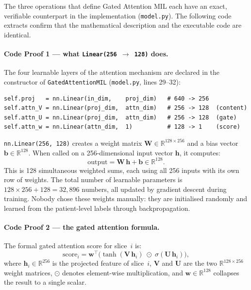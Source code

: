 The three operations that define Gated Attention MIL
each have an exact, verifiable counterpart in the
implementation (\texttt{model.py}).
The following code extracts confirm that the mathematical
description and the executable code are identical.


\paragraph{Code Proof 1 — what \texttt{Linear(256\,$\to$\,128)} does.}

The four learnable layers of the attention mechanism
are declared in the constructor of \texttt{GatedAttentionMIL}
(\texttt{model.py}, lines 29--32):

\begin{verbatim}
self.proj   = nn.Linear(in_dim,    proj_dim)   # 640 -> 256
self.attn_V = nn.Linear(proj_dim,  attn_dim)   # 256 -> 128  (content)
self.attn_U = nn.Linear(proj_dim,  attn_dim)   # 256 -> 128  (gate)
self.attn_w = nn.Linear(attn_dim,  1)          # 128 -> 1    (score)
\end{verbatim}

\texttt{nn.Linear(256, 128)} creates a weight matrix
$\mathbf{W} \in \mathbb{R}^{128 \times 256}$
and a bias vector $\mathbf{b} \in \mathbb{R}^{128}$.
When called on a 256-dimensional input vector
$\mathbf{h}$, it computes:
\begin{equation}
  \text{output} = \mathbf{W}\,\mathbf{h} + \mathbf{b}
  \in \mathbb{R}^{128}.
\end{equation}
This is 128 simultaneous weighted sums, each using
all 256 inputs with its own row of weights.
The total number of learnable parameters is
$128 \times 256 + 128 = 32{,}896$ numbers, all
updated by gradient descent during training.
Nobody chose these weights manually:
they are initialised randomly and learned from the
patient-level labels through backpropagation.


\paragraph{Code Proof 2 — the gated attention formula.}

The formal gated attention score for slice~$i$ is:
\begin{equation}
  \text{score}_i
  = \mathbf{w}^\top
    \bigl(\tanh(\mathbf{V}\,\mathbf{h}_i)
    \;\odot\;
    \sigma(\mathbf{U}\,\mathbf{h}_i)\bigr),
  \label{eq:gated-attention-code}
\end{equation}
where $\mathbf{h}_i \in \mathbb{R}^{256}$ is the
projected feature of slice~$i$,
$\mathbf{V}$ and $\mathbf{U}$ are the two
$\mathbb{R}^{128 \times 256}$ weight matrices,
$\odot$ denotes element-wise multiplication, and
$\mathbf{w} \in \mathbb{R}^{128}$ collapses the
result to a single scalar.

